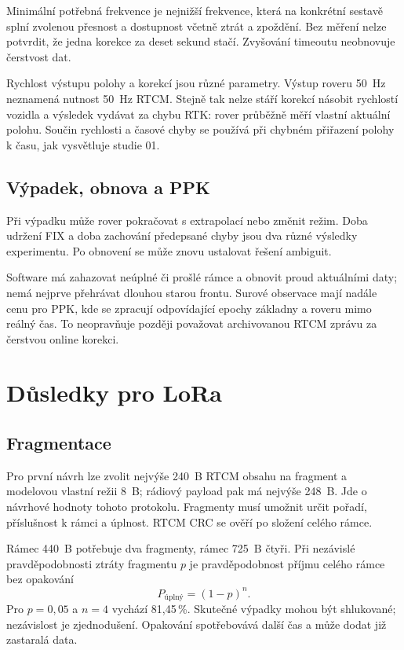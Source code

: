 \documentclass[11pt,a4paper]{article}
\begin{document}
Minimální potřebná frekvence je nejnižší frekvence, která na konkrétní sestavě splní zvolenou přesnost a dostupnost včetně ztrát a zpoždění. Bez měření nelze potvrdit, že jedna korekce za deset sekund stačí. Zvyšování timeoutu neobnovuje čerstvost dat.

Rychlost výstupu polohy a korekcí jsou různé parametry. Výstup roveru 50~Hz neznamená nutnost 50~Hz RTCM. Stejně tak nelze stáří korekcí násobit rychlostí vozidla a výsledek vydávat za chybu RTK: rover průběžně měří vlastní aktuální polohu. Součin rychlosti a časové chyby se používá při chybném přiřazení polohy k času, jak vysvětluje studie 01.

\subsection{Výpadek, obnova a PPK}
Při výpadku může rover pokračovat s extrapolací nebo změnit režim. Doba udržení FIX a doba zachování předepsané chyby jsou dva různé výsledky experimentu. Po obnovení se může znovu ustalovat řešení ambiguit.

Software má zahazovat neúplné či prošlé rámce a obnovit proud aktuálními daty; nemá nejprve přehrávat dlouhou starou frontu. Surové observace mají nadále cenu pro PPK, kde se zpracují odpovídající epochy základny a roveru mimo reálný čas. To neopravňuje později považovat archivovanou RTCM zprávu za čerstvou online korekci.

\section{Důsledky pro LoRa}
\subsection{Fragmentace}
Pro první návrh lze zvolit nejvýše 240~B RTCM obsahu na fragment a modelovou vlastní režii 8~B; rádiový payload pak má nejvýše 248~B. Jde o návrhové hodnoty tohoto protokolu. Fragmenty musí umožnit určit pořadí, příslušnost k rámci a úplnost. RTCM CRC se ověří po složení celého rámce.

Rámec 440~B potřebuje dva fragmenty, rámec 725~B čtyři. Při nezávislé pravděpodobnosti ztráty fragmentu $p$ je pravděpodobnost příjmu celého rámce bez opakování
\begin{equation}
 P_{\text{úplný}}=(1-p)^n.
\end{equation}
Pro $p=0{,}05$ a $n=4$ vychází 81,45\,\%. Skutečné výpadky mohou být shlukované; nezávislost je zjednodušení. Opakování spotřebovává další čas a může dodat již zastaralá data.
\end{document}
